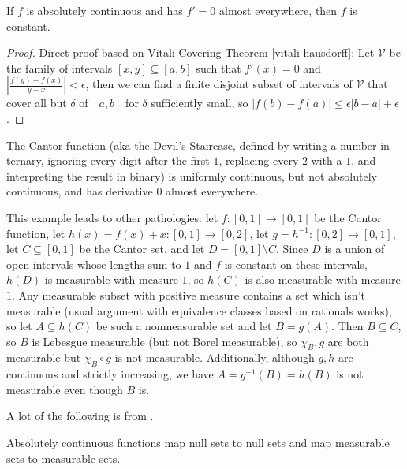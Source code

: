 \begin{cor} If $f$ is absolutely continuous and has $f' = 0$ almost everywhere, then $f$ is constant.
\end{cor}
\begin{proof} Direct proof based on Vitali Covering Theorem \ref{vitali-hausdorff}: Let $\mathcal{V}$ be the family of intervals $[x,y] \subseteq [a,b]$ such that $f'(x) = 0$ and $|\frac{f(y)-f(x)}{y-x}| < \epsilon$, then we can find a finite disjoint subset of intervals of $\mathcal{V}$ that cover all but $\delta$ of $[a,b]$ for $\delta$ sufficiently small, so $|f(b)-f(a)| \le \epsilon|b-a| + \epsilon$.
\end{proof}

\begin{ex} The Cantor function (aka the Devil's Staircase, defined by writing a number in ternary, ignoring every digit after the first $1$, replacing every $2$ with a $1$, and interpreting the result in binary) is uniformly continuous, but not absolutely continuous, and has derivative $0$ almost everywhere.

This example leads to other pathologies: let $f : [0,1] \rightarrow [0,1]$ be the Cantor function, let $h(x) = f(x)+x : [0,1] \rightarrow [0,2]$, let $g = h^{-1} : [0,2] \rightarrow [0,1]$, let $C \subseteq [0,1]$ be the Cantor set, and let $D = [0,1]\setminus C$. Since $D$ is a union of open intervals whose lengths sum to $1$ and $f$ is constant on these intervals, $h(D)$ is measurable with measure $1$, so $h(C)$ is also measurable with measure $1$. Any measurable subset with positive measure contains a set which isn't measurable (usual argument with equivalence classes based on rationals works), so let $A \subseteq h(C)$ be such a nonmeasurable set and let $B = g(A)$. Then $B \subseteq C$, so $B$ is Lebesgue measurable (but not Borel measurable), so $\chi_B,g$ are both measurable but $\chi_B\circ g$ is not measurable. Additionally, although $g,h$ are continuous and strictly increasing, we have $A = g^{-1}(B) = h(B)$ is not measurable even though $B$ is.
\end{ex}


A lot of the following is from \cite{gauge-integral}.

\begin{prop} Absolutely continuous functions map null sets to null sets and map measurable sets to measurable sets.
\end{prop}

